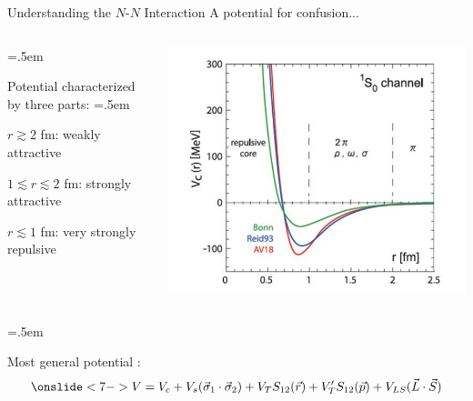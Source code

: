 \documentclass[xcolor={dvipsnames}]{beamer}
\let\olditemize=\itemize
\let\endolditemize=\enditemize
\renewenvironment{itemize}{\olditemize \itemsep=.5em }{\endolditemize}
\begin{document}
\begin{frame}{Understanding the $N$-$N$ Interaction}
\alert{A potential for confusion...}
\vspace{-2em}
\begin{columns}
    \begin{column}{.7\textwidth}
        \begin{itemize}
            \item<2-> Potential characterized by three parts:
            \begin{itemize}
                \item<3-> $r\gtrsim 2$ fm: weakly attractive
                \item<4-> $1\lesssim r \lesssim 2$ fm: strongly attractive
                \item<5-> $r \lesssim 1$ fm: very strongly repulsive
            \end{itemize}
        \end{itemize}
    \end{column}
    \begin{column}{.5\textwidth}
        \includegraphics[scale=0.5]{nn_pot.PNG}
    \end{column}
\end{columns}
\vspace{-1em}
\begin{itemize}
    \item<6-> Most general potential \cite{bertulani2007nuclear}:
    \[ \onslide<7->{V = V_c + V_s(\vec{\sigma}_1\cdot\vec{\sigma}_2) + V_TS_{12}(\vec{r}) + V_T'S_{12}(\vec{p}) + V_{LS}(\vec{L}\cdot\vec{S})} \]

\end{itemize}
\end{frame}
\end{document}
